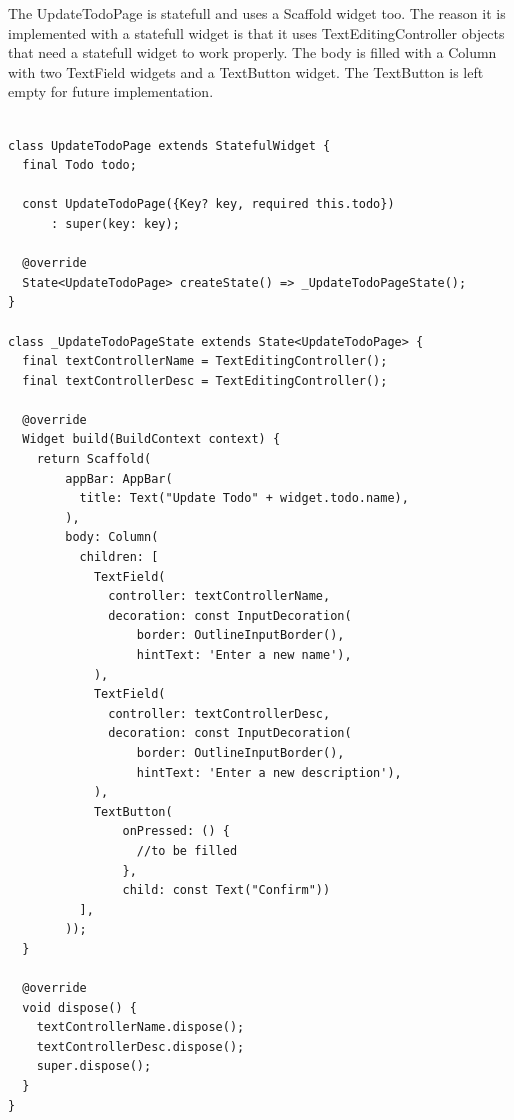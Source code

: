 The UpdateTodoPage is statefull and uses a Scaffold widget too. The reason it is implemented with a statefull widget is that it uses TextEditingController objects that need a statefull widget to work properly. The body is filled with a Column with two TextField widgets and a TextButton widget. The TextButton is left empty for future implementation.
	\mbox{}
	\begin{code}
	 \mbox{}
			\label{code:2.7}
	\begin{verbatim}

class UpdateTodoPage extends StatefulWidget {
  final Todo todo;

  const UpdateTodoPage({Key? key, required this.todo})
      : super(key: key);

  @override
  State<UpdateTodoPage> createState() => _UpdateTodoPageState();
}

class _UpdateTodoPageState extends State<UpdateTodoPage> {
  final textControllerName = TextEditingController();
  final textControllerDesc = TextEditingController();

  @override
  Widget build(BuildContext context) {
    return Scaffold(
        appBar: AppBar(
          title: Text("Update Todo" + widget.todo.name),
        ),
        body: Column(
          children: [
            TextField(
              controller: textControllerName,
              decoration: const InputDecoration(
                  border: OutlineInputBorder(), 
                  hintText: 'Enter a new name'),
            ),
            TextField(
              controller: textControllerDesc,
              decoration: const InputDecoration(
                  border: OutlineInputBorder(),
                  hintText: 'Enter a new description'),
            ),
            TextButton(
                onPressed: () {
                  //to be filled
                },
                child: const Text("Confirm"))
          ],
        ));
  }

  @override
  void dispose() {
    textControllerName.dispose();
    textControllerDesc.dispose();
    super.dispose();
  }
}

	\end{verbatim}
	\end{code}

